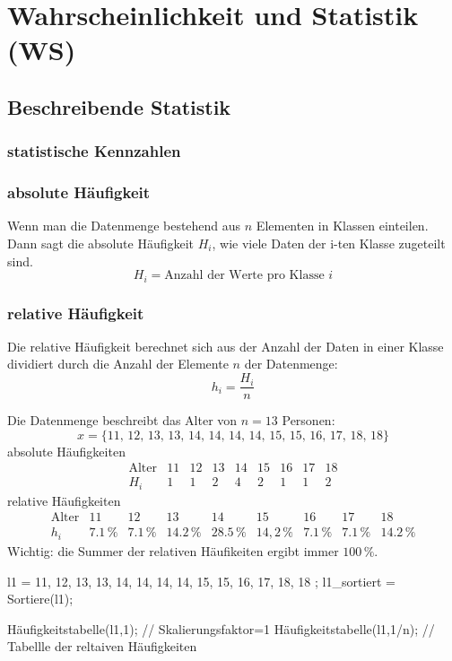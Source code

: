 \section{Wahrscheinlichkeit und Statistik (WS)}
\subsection{Beschreibende Statistik}
\subsubsection{statistische Kennzahlen}
\subsubsection*{absolute Häufigkeit}
Wenn man die Datenmenge bestehend aus $n$ Elementen in Klassen einteilen. Dann sagt die absolute Häufigkeit $H_i$, wie viele Daten der i-ten Klasse zugeteilt sind.
\[  
    H_i = \text{Anzahl der Werte pro Klasse } i
\]  
  
\subsubsection*{relative Häufigkeit}
Die relative Häufigkeit berechnet sich aus der Anzahl der Daten in einer Klasse dividiert durch die Anzahl der Elemente $n$ der Datenmenge:
\[  
    h_i = \frac{H_i}{n} 
\]
\begin{bsp}
Die Datenmenge beschreibt das Alter von $n=13$ Personen:
\[  
    x = \{11,\,12,\,13,\,13,\,14,\,14,\,14,\,14,\,15,\,15,\,16,\,17,\,18,\,18\}  
\]  
absolute Häufigkeiten
\[  
    \begin{array}{c|cccccccc}  
        \text{Alter} & 11 & 12 & 13 & 14 & 15 & 16 & 17 & 18 \\  
        \hline  
        H_i          &  1 &  1 &  2 &  4 &  2 &  1 &  1 &  2  
    \end{array}  
\]  
relative Häufigkeiten
\[  
    \begin{array}{c|cccccccc}  
        \text{Alter} & 11 & 12 & 13 & 14 & 15 & 16 & 17 & 18 \\  
        \hline  
        h_i          & 7.1\,\% & 7.1\,\% & 14.2\,\% & 28.5\,\% & 14{,}2\,\% & 7.1\,\% & 7.1\,\% & 14.2\,\%  
    \end{array}  
\]
Wichtig: die Summer der relativen Häufikeiten ergibt immer $100\,\%$.
\begin{geogebracode}
    l1 = { 11, 12, 13, 13, 14, 14, 14, 14, 15, 15, 16, 17, 18, 18 };
    l1_sortiert = Sortiere(l1);
    
    Häufigkeitstabelle(l1,1);  // Skalierungsfaktor=1
    Häufigkeitstabelle(l1,1/n);  // Tabellle der reltaiven Häufigkeiten
\end{geogebracode}
\end{bsp}

